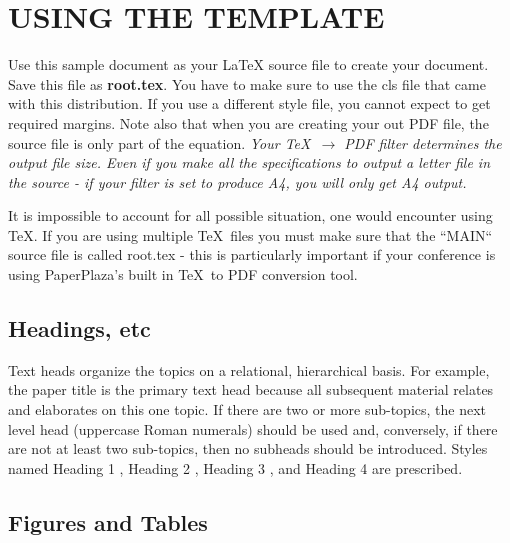 \documentclass[letterpaper, 10 pt, conference]{ieeeconf}  %
\begin{document}
%








\clearpage

\section{USING THE TEMPLATE}

Use this sample document as your LaTeX source file to create your document. Save this file as {\bf root.tex}. You have to make sure to use the cls file that came with this distribution. If you use a different style file, you cannot expect to get required margins. Note also that when you are creating your out PDF file, the source file is only part of the equation. {\it Your \TeX\ $\rightarrow$ PDF filter determines the output file size. Even if you make all the specifications to output a letter file in the source - if your filter is set to produce A4, you will only get A4 output. }

It is impossible to account for all possible situation, one would encounter using \TeX. If you are using multiple \TeX\ files you must make sure that the ``MAIN`` source file is called root.tex - this is particularly important if your conference is using PaperPlaza's built in \TeX\ to PDF conversion tool.

\subsection{Headings, etc}

Text heads organize the topics on a relational, hierarchical basis. For example, the paper title is the primary text head because all subsequent material relates and elaborates on this one topic. If there are two or more sub-topics, the next level head (uppercase Roman numerals) should be used and, conversely, if there are not at least two sub-topics, then no subheads should be introduced. Styles named  Heading 1 ,  Heading 2 ,  Heading 3 , and  Heading 4  are prescribed.

\subsection{Figures and Tables}
\end{document}
